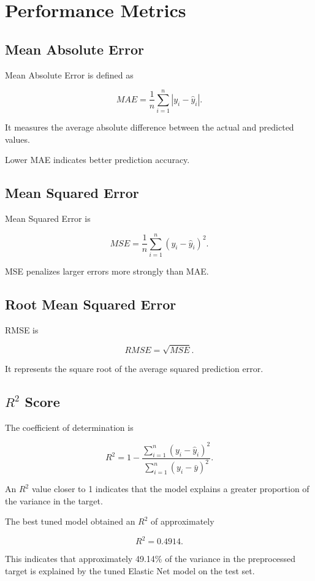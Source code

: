 \documentclass[12pt,a4paper]{article}
\begin{document}
\section{Performance Metrics}

\subsection{Mean Absolute Error}

Mean Absolute Error is defined as

\[
MAE =
\frac{1}{n}
\sum_{i=1}^{n}
|y_i-\hat{y}_i|.
\]

It measures the average absolute difference between the actual and
predicted values.

Lower MAE indicates better prediction accuracy.

\subsection{Mean Squared Error}

Mean Squared Error is

\[
MSE =
\frac{1}{n}
\sum_{i=1}^{n}
(y_i-\hat{y}_i)^2.
\]

MSE penalizes larger errors more strongly than MAE.

\subsection{Root Mean Squared Error}

RMSE is

\[
RMSE = \sqrt{MSE}.
\]

It represents the square root of the average squared prediction error.

\subsection{$R^2$ Score}

The coefficient of determination is

\[
R^2 =
1-
\frac{
\sum_{i=1}^{n}(y_i-\hat{y}_i)^2
}{
\sum_{i=1}^{n}(y_i-\bar{y})^2
}.
\]

An $R^2$ value closer to 1 indicates that the model explains a greater
proportion of the variance in the target.

The best tuned model obtained an $R^2$ of approximately

\[
R^2=0.4914.
\]

This indicates that approximately 49.14\% of the variance in the
preprocessed target is explained by the tuned Elastic Net model on the
test set.
\end{document}
